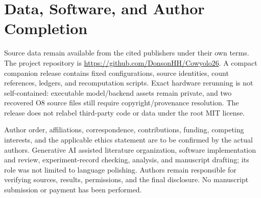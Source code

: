 \documentclass[journal]{IEEEtran}
\begin{document}
\section*{Data, Software, and Author Completion}
Source data remain available from the cited publishers under their own terms. The project repository is \url{https://github.com/DonsonHH/Cowyolo26}. A compact companion release contains fixed configurations, source identities, count references, ledgers, and recomputation scripts. Exact hardware rerunning is not self-contained: executable model/backend assets remain private, and two recovered O8 source files still require copyright/provenance resolution. The release does not relabel third-party code or data under the root MIT license.

Author order, affiliations, correspondence, contributions, funding, competing interests, and the applicable ethics statement are to be confirmed by the actual authors. Generative AI assisted literature organization, software implementation and review, experiment-record checking, analysis, and manuscript drafting; its role was not limited to language polishing. Authors remain responsible for verifying sources, results, permissions, and the final disclosure. No manuscript submission or payment has been performed.



\end{document}
